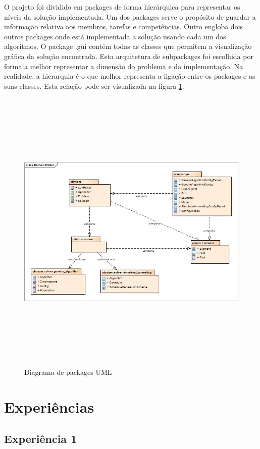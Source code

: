 \begin{titlepage}
O projeto foi dividido em packages de forma hierárquica para representar os níveis da solução implementada. Um dos packages serve o propósito de guardar a informação relativa aos membros, tarefas e competências. Outro engloba dois outros packages onde está implementada a solução usando cada um dos algoritmos. O package .gui contém todas as classes que permitem a visualização gráfica da solução encontrada. Esta arquitetura de subpackages foi escolhida por forma a melhor representar a dimensão do problema e da implementação. Na realidade, a hierarquia é o que melhor representa a ligação entre os packages e as suas classes. Esta relação pode ser visualizada na figura \ref{packageD}.

\begin{figure}[H]
  \centering
    \includegraphics[width=18cm, height = 14cm]{packageDiagram.jpg}
  \caption{Diagrama de packages UML}
  \label{packageD}
\end{figure}

\section{Experiências}

\subsection{Experiência 1}


\end{titlepage}
